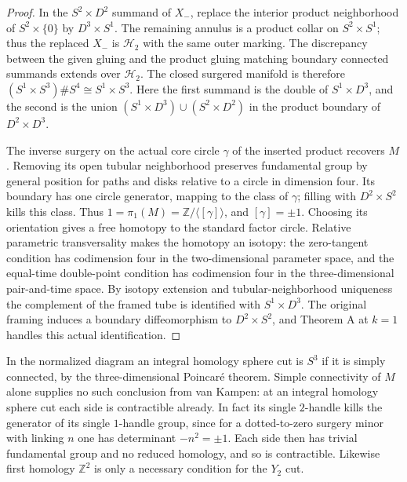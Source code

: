\documentclass[11pt,letterpaper]{article}
\numberwithin{equation}{section}
\newcommand{\HB}[1]{\mathcal H_{#1}}
\begin{document}
\begin{proof}
In the \(S^2\times D^2\) summand of \(X_-\), replace the interior
product neighborhood of \(S^2\times\{0\}\) by \(D^3\times S^1\).
The remaining annulus is a product collar on \(S^2\times S^1\);
thus the replaced \(X_-\) is \(\HB{2}\) with the same outer
marking. The discrepancy between the given gluing and the product
gluing matching boundary connected summands extends over
\(\HB{2}\). The closed surgered manifold is therefore
\((S^1\times S^3)\#S^4\cong S^1\times S^3\). Here the first
summand is the double of \(S^1\times D^3\), and the second is
the union \((S^1\times D^3)\cup(S^2\times D^2)\) in the
product boundary of \(D^2\times D^3\).

The inverse surgery on the actual core circle \(\gamma\) of the
inserted product recovers \(M\). Removing its open tubular
neighborhood preserves fundamental group by general position for
paths and disks relative to a circle in dimension four. Its
boundary has one circle generator, mapping to the class of
\(\gamma\); filling with \(D^2\times S^2\) kills this class.
Thus \(1=\pi_1(M)=\mathbb Z/\langle[\gamma]\rangle\), and
\([\gamma]=\pm1\). Choosing its orientation gives a free
homotopy to the standard factor circle. Relative parametric
transversality makes the homotopy an isotopy: the zero-tangent
condition has codimension four in the two-dimensional parameter
space, and the equal-time double-point condition has codimension
four in the three-dimensional pair-and-time space. By isotopy
extension and tubular-neighborhood uniqueness the complement of
the framed tube is identified with \(S^1\times D^3\). The original
framing induces a boundary diffeomorphism to \(D^2\times S^2\),
and Theorem A at \(k=1\) handles this actual identification.
\end{proof}

In the normalized diagram an integral homology sphere cut is
\(S^3\) if it is simply connected, by the three-dimensional
Poincar\'e theorem. Simple connectivity of \(M\) alone supplies
no such conclusion from van Kampen: at an integral homology sphere
cut each side is contractible already. In fact its single
\(2\)-handle kills the generator of its single \(1\)-handle group,
since for a dotted-to-zero surgery minor with linking \(n\)
one has determinant \(-n^2=\pm1\). Each side then has trivial
fundamental group and no reduced homology, and so is contractible.
Likewise first homology \(\mathbb Z^2\) is only a necessary
condition for the \(Y_2\) cut.
\end{document}
